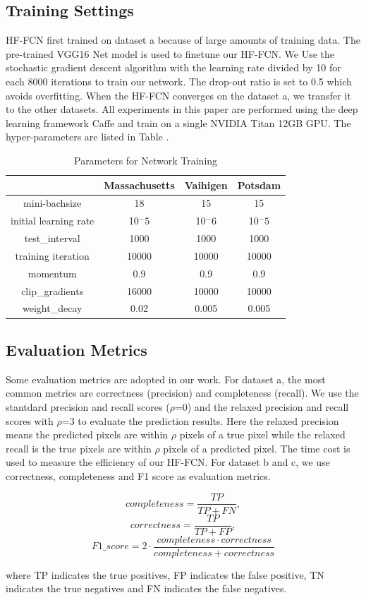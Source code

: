 \subsection{Training Settings}
HF-FCN first trained on dataset a because of large amounts of training data. The pre-trained VGG16 Net model is used to finetune our HF-FCN. We Use the stochastic gradient descent algorithm with the learning rate divided by 10 for each 8000 iterations to train our network. The drop-out ratio is set to 0.5 which avoids overfitting. When the HF-FCN converges on the dataset a, we transfer it to the other datasets. All experiments in this paper are performed using the deep learning framework Caffe and train on a single NVIDIA Titan 12GB GPU. The hyper-parameters are listed in Table .
\begin{table}
\centering
\caption {Parameters for Network Training}
\begin{tabular}{c|c|c|c}
\hline
&Massachusetts &Vaihigen &Potsdam\\  \hline
mini-bachsize &18& 15 &15 \\
initial learning rate &10$^-5$ & 10$^-6$ &10$^-5$\\
test\_interval&1000 & 1000 &1000\\
training iteration &10000 & 10000& 10000\\
momentum&0.9 &0.9 &0.9\\
clip\_gradients &16000& 10000 &10000\\
weight\_decay&0.02& 0.005 &0.005\\ \hline
\end{tabular}
\end{table}

\subsection{Evaluation Metrics}
Some evaluation metrics are adopted in our work. For dataset a, the most common metrics are correctness (precision) and completeness (recall). We use the stantdard precision and recall scores ($\rho$=0) and the relaxed precision and recall scores with $\rho$=3 to evaluate the prediction results. Here the relaxed precision means the predicted pixels are within $\rho$ pixels of a true pixel while the relaxed recall is the true pixels are within $\rho$ pixels of a predicted pixel. The time cost is used to measure the efficiency of our HF-FCN. For dataset b and c, we use correctness, completeness and F1 score as evaluation metrics. \par
\begin{equation}
 {completeness} = \frac{TP}{TP+FN},
\end{equation}
\begin{equation}
{correctness} = \frac{TP}{TP+FP},
\end{equation}
\begin{equation}
{F1\_score}= 2\cdot\frac{completeness\cdot correctness}{completeness+correctness}
\end{equation}

where TP indicates the true positives, FP indicates the false positive, TN indicates the true negatives and FN indicates the false negatives.